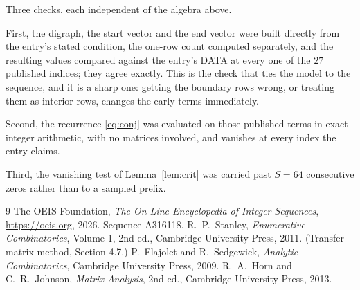 \documentclass[11pt,a4paper]{article}
\theoremstyle{plain}
\theoremstyle{definition}
\begin{document}
Three checks, each independent of the algebra above.

First, the digraph, the start vector and the end vector were built directly from the
entry's stated condition, the one-row count computed separately, and the resulting values
compared against the entry's DATA at every one of the $27$ published indices; they
agree exactly. This is the check that ties the model to the sequence, and it is a sharp one:
getting the boundary rows wrong, or treating them as interior rows, changes the early terms
immediately.

Second, the recurrence \eqref{eq:conj} was evaluated on those published terms in exact
integer arithmetic, with no matrices involved, and vanishes at every index the entry claims.

Third, the vanishing test of Lemma~\ref{lem:crit} was carried past $S=64$ consecutive
zeros rather than to a sampled prefix.

\begin{thebibliography}{9}
 The OEIS Foundation, \emph{The On-Line Encyclopedia of Integer
Sequences}, \url{https://oeis.org}, 2026. Sequence A316118.
 R.~P.~Stanley, \emph{Enumerative Combinatorics}, Volume 1, 2nd ed.,
Cambridge University Press, 2011. (Transfer-matrix method, Section 4.7.)
 P.~Flajolet and R.~Sedgewick, \emph{Analytic Combinatorics}, Cambridge
University Press, 2009.
 R.~A.~Horn and C.~R.~Johnson, \emph{Matrix Analysis}, 2nd ed., Cambridge
University Press, 2013.
\end{thebibliography}
\end{document}
